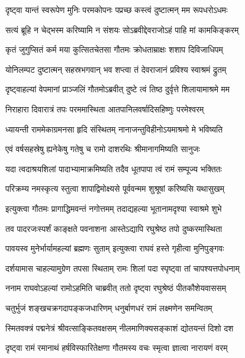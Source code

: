 \twolineshloka
{दृष्ट्वा यान्तं स्वरूपेण मुनिः परमकोपनः}
{पप्रच्छ कस्त्वं दुष्टात्मन् मम रूपधरोऽधमः} %

\twolineshloka
{सत्यं ब्रूहि न चेद्भस्म करिष्यामि न संशयः}
{सोऽब्रवीद्देवराजोऽहं पाहि मां कामकिङ्करम्} %

\twolineshloka
{कृतं जुगुप्सितं कर्म मया कुत्सितचेतसा}
{गौतमः क्रोधताम्राक्षः शशाप दिविजाधिपम्} %

\twolineshloka
{योनिलम्पट दुष्टात्मन् सहस्रभगवान् भव}
{शप्त्वा तं देवराजानं प्रविश्य स्वाश्रमं द्रुतम्} %

\twolineshloka
{दृष्ट्वाहल्यां वेपमानां प्राञ्जलिं गौतमोऽब्रवीत्}
{दुष्टे त्वं तिष्ठ दुर्वृत्ते शिलायामाश्रमे मम} %

\twolineshloka
{निराहारा दिवारात्रं तपः परममास्थिता}
{आतपानिलवर्षादिसहिष्णुः परमेश्वरम्} %

\twolineshloka
{ध्यायन्ती राममेकाग्रमनसा हृदि संस्थितम्}
{नानाजन्तुविहीनोऽयमाश्रमो मे भविष्यति} %

\twolineshloka
{एवं वर्षसहस्रेषु ह्यनेकेषु गतेषु च}
{रामो दाशरथिः श्रीमानागमिष्यति सानुजः} %

\twolineshloka
{यदा त्वदाश्रयशिलां पादाभ्यामाक्रमिष्यति}
{तदैव धूतपापा त्वं रामं सम्पूज्य भक्तितः} %

\twolineshloka
{परिक्रम्य नमस्कृत्य स्तुत्वा शापाद्विमोक्ष्यसे}
{पूर्ववन्मम शुश्रूषां करिष्यसि यथासुखम्} %

\twolineshloka
{इत्युक्त्वा गौतमः प्रागाद्धिमवन्तं नगोत्तमम्}
{तदाद्यहल्या भूतानामदृश्या स्वाश्रमे शुभे} %

\twolineshloka
{तव पादरजःस्पर्शं काङ्क्षते पवनाशना}
{आस्तेऽद्यापि रघुश्रेष्ठ तपो दुष्करमास्थिता} %

\twolineshloka
{पावयस्व मुनेर्भार्यामहल्यां ब्रह्मणः सुताम्}
{इत्युक्त्वा राघवं हस्ते गृहीत्वा मुनिपुङ्गवः} %

\twolineshloka
{दर्शयामास चाहल्यामुग्रेण तपसा स्थिताम्}
{रामः शिलां पदा स्पृष्ट्वा तां चापश्यत्तपोधनाम्} %

\twolineshloka
{ननाम राघवोऽहल्यां रामोऽहमिति चाब्रवीत्}
{ततो दृष्ट्वा रघुश्रेष्ठं पीतकौशेयवाससम्} %

\twolineshloka
{चतुर्भुजं शङ्खचक्रगदापङ्कजधारिणम्}
{धनुर्बाणधरं रामं लक्ष्मणेन समन्वितम्} %

\twolineshloka
{स्मितवक्त्रं पद्मनेत्रं श्रीवत्साङ्कितवक्षसम्}
{नीलमाणिक्यसङ्काशं द्योतयन्तं दिशो दश} %

\twolineshloka
{दृष्ट्वा रामं रमानाथं हर्षविस्फारितेक्षणा}
{गौतमस्य वचः स्मृत्वा ज्ञात्वा नारायणं वरम्} %

